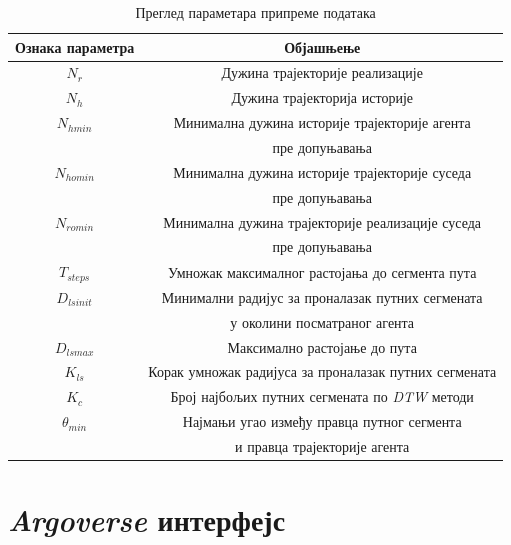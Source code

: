 \documentclass[11pt,oneside]{memoir}
\begin{document}
\begin{table}[H]
  \centering
  \begin{tabular}{c|c}
    Ознака параметра & Објашњење \\
    \hline
    $N_r$ & Дужина трајекторије реализације \\
    \hline
    $N_h$ & Дужина трајекторија историје \\
    \hline
    $N_{hmin}$ & Минимална дужина историје трајекторије агента \\
    & пре допуњавања \\
    \hline
    $N_{homin}$ & Минимална дужина историје трајекторије суседа \\
    & пре допуњавања \\
    \hline
    $N_{romin}$ & Минимална дужина трајекторије реализације суседа \\
    & пре допуњавања \\
    \hline
    $T_{steps}$ & Умножак максималног растојања до сегмента пута \\
    \hline
    $D_{lsinit}$ & Минимални радијус за проналазак путних сегмената \\
    & у околини посматраног агента \\
    \hline
    $D_{lsmax}$ & Максимално растојање до пута \\
    \hline
    $K_{ls}$ & Корак умножак радијуса за проналазак путних сегмената \\
    \hline
    $K_c$ & Број најбољих путних сегмената по \textit{DTW} методи \\
    \hline
    $\theta_{min}$ & Најмањи угао између правца путног сегмента \\
    & и правца трајекторије агента
  \end{tabular}
  \caption{Преглед параметара припреме података}
  \label{dp-params-table}
\end{table}

\section{\textit{Argoverse} интерфејс}
\end{document}
